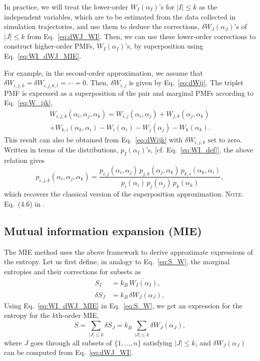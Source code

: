 \documentclass[reprint, superscriptaddress]{revtex4-1}
\newcommand{\note}[1]{{\color{DarkGreen}\footnotesize \textsc{Note.} #1}}
\begin{document}
In practice, we will treat the lower-order $W_I(\alpha_I)$'s
for $|I| \le k$ as the independent variables,
which are to be estimated from the data collected in simulation trajectories,
%
and use them to deduce the corrections,
$\delta W_J(\alpha_J)$'s of $|J| \le k$ from Eq.~\eqref{eq:dWJ_WI}.
%
Then, we can use these lower-order corrections
to construct higher-order PMFs, $W_I(\alpha_I)$'s,
by superposition using Eq.~\eqref{eq:WI_dWJ_MIE}.

For example,
in the second-order approximation,
we assume that
$\delta W_{i, j, k} = \delta W_{i,j,k, l} = \cdots = 0$.
%
Then, $\delta W_{i,j}$ is given by Eq.~\eqref{eq:dWij}.
The triplet PMF is expressed as a superposition
of the pair and marginal PMFs according to Eq.~\eqref{eq:W_ijk},
\begin{align*}
W_{i,j,k}(\alpha_i, \alpha_j, \alpha_k)
=
W_{i,j}(\alpha_i, \alpha_j) + W_{j,k}(\alpha_j, \alpha_k)\\
  + W_{k,i}(\alpha_k, \alpha_i)
  - W_i(\alpha_i) - W_j(\alpha_j) - W_k(\alpha_k)
.
\end{align*}
%
This result can also be obtained from Eq.~\eqref{eq:dWijk} with $\delta W_{i,j,k}$ set to zero.
%
Written in terms of the distributions, $p_I(\alpha_I)$'s,
[cf. Eq.~\eqref{eq:WI_def}], the above relation gives
%
$$
p_{i,j,k}(\alpha_i, \alpha_j, \alpha_k)
=
\frac{ p_{i,j}(\alpha_i, \alpha_j) \, p_{j,k}(\alpha_j, \alpha_k) \, p_{k,i}(\alpha_k, \alpha_i) }{ p_i(\alpha_i) \, p_j(\alpha_j) \, p_k(\alpha_k) }
,
$$
which recovers the classical version of the superposition approximation\cite{kirkwood1935, born1946}.
\note{Eq.~(4.6) in \cite{born1946}.}



\subsection{Mutual information expansion (MIE)}


The MIE method uses the above framework to derive approximate expressions of the entropy.
%
Let us first define, in analogy to Eq.~\eqref{eq:S_W},
the marginal entropies and their corrections for subsets as
%
\begin{align*}
  S_I
  &= k_B \, \overline{ W_I(\alpha_I) }
  ,
  \\
  \delta S_J
  &= k_B \, \overline{ \delta W_J(\alpha_J) }
  ,
\end{align*}
%
Using Eq.~\eqref{eq:WI_dWJ_MIE} in Eq.~\eqref{eq:S_W},
we get an expression for the entropy for the $k$th-order MIE,
\begin{equation}
  S
  =
  \sum_{|J| \le k} \delta S_J
  =
  k_B \,
  \sum_{|J| \le k} \overline{ \delta W_J(\alpha_J) }
  ,
  \label{eq:ent_MIE1}
\end{equation}
where $J$ goes through all subsets of $\{1, \dots, n\}$ satisfying $|J| \le k$,
and $\delta W_J(\alpha_J)$ can be computed from Eq.~\eqref{eq:dWJ_WI}.
\end{document}
